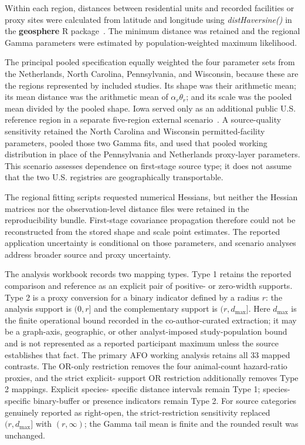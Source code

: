 \documentclass[11pt]{article}
\begin{document}
Within each region, distances between residential units and recorded facilities or proxy sites were
calculated from latitude and longitude using \textit{distHaversine()} in the
\textbf{geosphere} R package~\cite{Hijmans2024_geosphere}. The minimum distance
was retained and the regional Gamma parameters were estimated by
population-weighted maximum likelihood.

The principal pooled specification equally weighted the four parameter sets
from the Netherlands, North Carolina, Pennsylvania, and Wisconsin, because
these are the regions represented by included studies. Its shape was their
arithmetic mean; its mean distance was the arithmetic mean of
$\alpha_r\theta_r$; and its scale was the pooled mean divided by the pooled
shape. Iowa served only as an additional public U.S. reference region in a
separate five-region external scenario~\cite{Esri_IowaCensus2020,IowaDNR2025_AFO}.
A source-quality sensitivity retained the North Carolina and Wisconsin
permitted-facility parameters, pooled those two Gamma fits, and used that pooled
working distribution in place of the Pennsylvania and Netherlands proxy-layer
parameters. This scenario assesses dependence on first-stage source type; it
does not assume that the two U.S. registries are geographically transportable.

The regional fitting scripts requested numerical Hessians, but neither the
Hessian matrices nor the observation-level distance files were retained in the
reproducibility bundle. First-stage covariance propagation therefore could not
be reconstructed from the stored shape and scale point estimates. The reported
application uncertainty is conditional on those parameters, and scenario
analyses address broader source and proxy uncertainty.

The analysis workbook records two mapping types. Type 1 retains the reported
comparison and reference as an explicit pair of positive- or zero-width
supports. Type 2 is a proxy conversion for a binary indicator defined by a
radius $r$: the analysis support is $(0,r]$ and the complementary support is
$(r,d_{\max}]$. Here $d_{\max}$ is the finite operational bound recorded in the
co-author-curated extraction; it may be a graph-axis, geographic, or other
analyst-imposed study-population bound and is not represented as a reported
participant maximum unless the source establishes that fact. The primary AFO
working analysis retains all 33 mapped contrasts. The OR-only restriction
removes the four animal-count hazard-ratio proxies, and the strict explicit-
support OR restriction additionally removes Type 2 mappings. Explicit species-
specific distance intervals remain Type 1; species-specific binary-buffer or
presence indicators remain Type 2. For source categories genuinely reported as
right-open, the strict-restriction sensitivity replaced $(r,d_{\max}]$ with
$(r,\infty)$; the Gamma tail mean is finite and the rounded result was unchanged.
\end{document}

